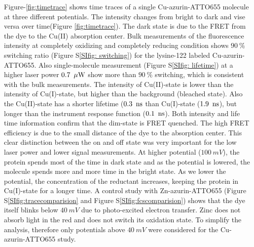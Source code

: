 Figure-\ref{fig:timetrace} shows time traces of a single Cu-azurin-ATTO655 molecule at three different potentials. The intensity changes from bright to dark and vise versa over time(Figure \ref{fig:timetrace}). The dark state is due to the FRET from the dye to the Cu(II) absorption center\cite{kuznetsova2006a}. Bulk measurements of the fluorescence intensity at completely oxidizing and completely reducing condition shows $90~$\% switching ratio (Figure S\ref{SIfig: switching}) for the lysine-122 labeled Cu-azurin-ATTO655.\cite{nicolardi2012topdown} Also single-molecule measurement (Figure S\ref{SIfig: lifetime}) at a higher laser power $0.7~\,\mu\textrm{W}$ show more than $90~\%$ switching, which is consistent with the bulk measurements. The intensity of Cu(II)-state is lower than the intensity of Cu(I)-state, but higher than the background (bleached state). Also the Cu(II)-state has a shorter lifetime ($0.3~\,\textrm{ns}$ than Cu(I)-state ($1.9~\,\textrm{ns}$), but longer than the instrument response function ($0.1~\,\textrm{ns}$). Both intensity and life time information confirm that the dim-state is FRET quenched. The high FRET efficiency is due to the small distance of the dye to the absorption center. This clear distinction between the on and off state was very important for the low laser power and lower signal measurements. At higher potential ($100~mV$), the protein spends most of the time in dark state and as the potential is lowered, the molecule spends more and more time in the bright state. As we lower the potential, the concentration of the reductant increases, keeping the protein in Cu(I)-state for a longer time. A control study with Zn-azurin-ATTO655 (Figure S\ref{SIfig:tracecomparision} and Figure S\ref{SIfig:fcscomparision}) shows that the dye itself blinks below $40~mV$ due to photo-excited electron transfer. Zinc does not absorb light in the red and does not switch its oxidation state. To simplify the analysis, therefore only potentials above $40~mV$ were considered for the Cu-azurin-ATTO655 study.\\
